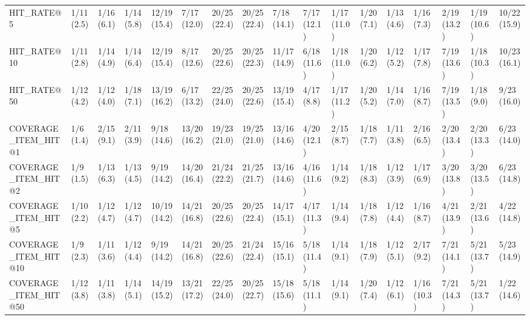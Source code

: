 \begin{tabular}{lllllllllllllllll}
HIT_RATE@5                  &     1/11 (2.5) &     1/16 (6.1) &    1/14 (5.8) &   12/19 (15.4) &    7/17 (12.0) &      20/25 (22.4) &   20/25 (22.4) &   7/18 (14.1) &    7/17 (12.1) &  1/17 (11.0) &  1/20 (7.1) &     1/13 (4.6) &            1/16 (7.3) &         2/19 (13.2) &  1/19 (10.6) &  10/22 (15.9) \\
HIT_RATE@10                 &     1/11 (2.8) &     1/14 (4.9) &    1/14 (6.4) &   12/19 (15.4) &    8/17 (12.6) &      20/25 (22.6) &   20/25 (22.3) &  11/17 (14.9) &    6/18 (11.6) &  1/18 (11.0) &  1/20 (6.2) &     1/12 (5.2) &            1/17 (7.8) &         7/19 (13.6) &  1/18 (10.3) &  10/23 (16.1) \\
HIT_RATE@50                 &     1/12 (4.2) &     1/12 (4.0) &    1/18 (7.1) &   13/19 (16.2) &    6/17 (13.2) &      22/25 (24.0) &   20/25 (22.6) &  13/19 (15.4) &     4/17 (8.8) &  1/17 (11.2) &  1/20 (5.2) &     1/14 (7.0) &            1/16 (8.7) &         7/19 (13.5) &   1/18 (9.0) &   9/23 (16.0) \\
COVERAGE_ITEM_HIT@1         &      1/6 (1.4) &     2/15 (9.1) &    2/11 (3.9) &    9/18 (14.6) &   13/20 (16.2) &      19/23 (21.0) &   19/25 (21.0) &  13/16 (14.6) &    4/20 (12.1) &   2/15 (8.7) &  1/18 (7.7) &     1/11 (3.8) &            2/16 (6.5) &         2/20 (13.4) &  2/20 (13.3) &   6/23 (14.0) \\
COVERAGE_ITEM_HIT@2         &      1/9 (1.5) &     1/13 (6.3) &    1/13 (4.5) &    9/19 (14.2) &   14/20 (16.4) &      21/24 (22.2) &   21/25 (21.7) &  13/16 (14.6) &    4/16 (11.6) &   1/14 (9.2) &  1/18 (8.3) &     1/12 (3.9) &            1/17 (6.9) &         3/20 (13.8) &  3/20 (13.5) &   6/23 (14.8) \\
COVERAGE_ITEM_HIT@5         &     1/10 (2.2) &     1/12 (4.7) &    1/12 (4.7) &   10/19 (14.2) &   14/21 (16.8) &      20/25 (22.6) &   20/25 (22.4) &  14/17 (15.1) &    4/17 (11.3) &   1/14 (9.4) &  1/18 (7.8) &     1/12 (4.4) &            1/16 (8.7) &         4/21 (13.9) &  2/21 (13.6) &   4/22 (14.8) \\
COVERAGE_ITEM_HIT@10        &      1/9 (2.3) &     1/11 (3.6) &    1/12 (4.4) &    9/19 (14.2) &   14/21 (16.8) &      20/25 (22.6) &   21/24 (22.4) &  15/16 (15.1) &    5/18 (11.4) &   1/14 (9.1) &  1/18 (7.9) &     1/12 (5.1) &            2/17 (9.2) &         7/21 (14.1) &  5/21 (13.7) &   5/23 (14.9) \\
COVERAGE_ITEM_HIT@50        &     1/12 (3.8) &     1/11 (3.8) &    1/14 (5.1) &   14/19 (15.2) &   13/21 (17.2) &      22/25 (24.0) &   20/25 (22.7) &  15/18 (15.6) &    5/18 (11.1) &   1/14 (9.1) &  1/20 (7.4) &     1/12 (6.1) &           1/16 (10.3) &         7/21 (14.3) &  5/21 (13.7) &   1/22 (14.6) \\
\bottomrule
\end{tabular}

